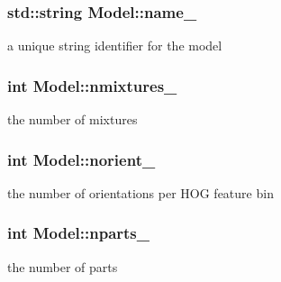 \subsubsection[{name\+\_\+}]{\setlength{\rightskip}{0pt plus 5cm}std\+::string Model\+::name\+\_\+\hspace{0.3cm}{\ttfamily [protected]}}\label{classModel_afca3bde5ad33e936c455d3d311b8406d}


a unique string identifier for the model 

\hypertarget{classModel_a047a8d7591bde166f0c3ab36a2130b53}{}
\subsubsection[{nmixtures\+\_\+}]{\setlength{\rightskip}{0pt plus 5cm}int Model\+::nmixtures\+\_\+\hspace{0.3cm}{\ttfamily [protected]}}\label{classModel_a047a8d7591bde166f0c3ab36a2130b53}


the number of mixtures 

\hypertarget{classModel_a40c5597450f8efb960bb7da74890e73c}{}
\subsubsection[{norient\+\_\+}]{\setlength{\rightskip}{0pt plus 5cm}int Model\+::norient\+\_\+\hspace{0.3cm}{\ttfamily [protected]}}\label{classModel_a40c5597450f8efb960bb7da74890e73c}


the number of orientations per H\+O\+G feature bin 

\hypertarget{classModel_ae8b3d33dbc43d6ab07c1553c9a1bbc2e}{}
\subsubsection[{nparts\+\_\+}]{\setlength{\rightskip}{0pt plus 5cm}int Model\+::nparts\+\_\+\hspace{0.3cm}{\ttfamily [protected]}}\label{classModel_ae8b3d33dbc43d6ab07c1553c9a1bbc2e}


the number of parts 

\hypertarget{classModel_ab711641b36aa9b8b578acf151af55aa7}{}
